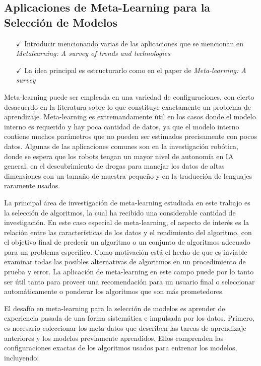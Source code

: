 \subsection{Aplicaciones de Meta-Learning para la Selección de Modelos}

\begin{itemize}
	\item[$\checkmark$] Introducir mencionando varias de las aplicaciones  que se mencionan en \textit{Metalearning: A survey of trends and technologies}
	\item[$\checkmark$] La idea principal es estructurarlo como en el paper de \textit{Meta-learning: A survey}
\end{itemize}

Meta-learning puede ser empleada en una variedad de configuraciones, con cierto desacuerdo en la literatura sobre lo que constituye exactamente un problema de aprendizaje. Meta-learning es extremandamente útil en los casos donde el modelo interno es requerido y hay poca cantidad de datos, ya que el modelo interno contiene muchos parámetros que no pueden ser estimados precisamente con pocos datos. Algunas de las aplicaciones comunes son en la investigación robótica, donde se espera que los robots tengan un mayor nivel de autonomía en IA general, en el descubrimiento de drogas para manejar los datos de altas dimensiones con un tamaño de muestra pequeño y en la traducción de lenguajes raramente usados. 

La principal área de investigación de meta-learning estudiada en este trabajo es la selección de algoritmos, la cual ha recibido una considerable cantidad de investigación. En este caso especial de meta-learning, el aspecto de interés es la relación entre las características de los datos y el rendimiento del algoritmo, con el objetivo final de predecir un algoritmo o un conjunto de algoritmos adecuado para un problema específico. Como motivación está el hecho de que es inviable examinar todas las posibles alternativas de algoritmos en un procedimiento de prueba y error. La aplicación de meta-learning en este campo puede por lo tanto ser útil tanto para proveer una recomendación para un usuario final o seleccionar automáticamente o ponderar los algoritmos que son más prometedores. 

El desafío en meta-learning para la selección de modelos es aprender de experiencia pasada de una forma sistemática e impulsada por los datos. Primero, es necesario coleccionar los meta-datos que describen las tareas de aprendizaje anteriores y los modelos previamente aprendidos. Ellos comprenden las configuraciones exactas de los algoritmos usados para entrenar los modelos, incluyendo:

